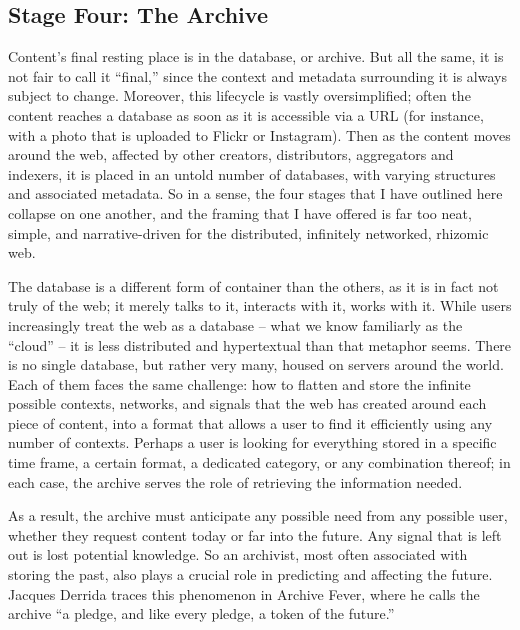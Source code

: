 \subsection{Stage Four: The Archive}

Content’s final resting place is in the database, or archive. But all the same, it is not fair to call it “final,” since the context and metadata surrounding it is always subject to change. Moreover, this lifecycle is vastly oversimplified; often the content reaches a database as soon as it is accessible via a URL (for instance, with a photo that is uploaded to Flickr or Instagram). Then as the content moves around the web, affected by other creators, distributors, aggregators and indexers, it is placed in an untold number of databases, with varying structures and associated metadata. So in a sense, the four stages that I have outlined here collapse on one another, and the framing that I have offered is far too neat, simple, and narrative-driven for the distributed, infinitely networked, rhizomic web.

The database is a different form of container than the others, as it is in fact not truly of the web; it merely talks to it, interacts with it, works with it. While users increasingly treat the web as a database – what we know familiarly as the “cloud” – it is less distributed and hypertextual than that metaphor seems. There is no single database, but rather very many, housed on servers around the world. Each of them faces the same challenge: how to flatten and store the infinite possible contexts, networks, and signals that the web has created around each piece of content, into a format that allows a user to find it efficiently using any number of contexts. Perhaps a user is looking for everything stored in a specific time frame, a certain format, a dedicated category, or any combination thereof; in each case, the archive serves the role of retrieving the information needed.

As a result, the archive must anticipate any possible need from any possible user, whether they request content today or far into the future. Any signal that is left out is lost potential knowledge. So an archivist, most often associated with storing the past, also plays a crucial role in predicting and affecting the future. Jacques Derrida traces this phenomenon in Archive Fever, where he calls the archive “a pledge, and like every pledge, a token of the future.” 

